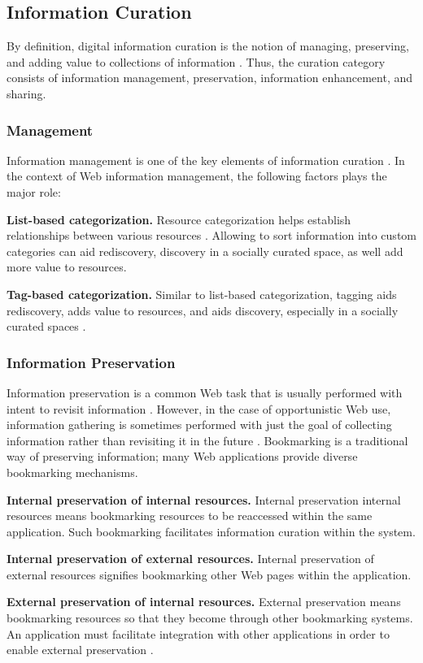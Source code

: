 \documentclass{casconpaper}
\begin{document}
{\subsection{Information Curation}
By definition, digital information curation is the notion of managing, preserving, and adding value to collections of information \cite{beagrie, wittaker}. Thus, the curation category consists of information management, preservation, information enhancement, and sharing.  
} %

{\subsubsection{Management}
Information management is one of the key elements of information curation \cite{beagrie, wittaker}. In the context of Web information management, the following factors plays the major role:

\textbf{List-based categorization.} Resource categorization helps establish relationships between various resources \cite{beagrie, wittaker}. Allowing to sort information into custom categories can aid rediscovery, discovery in a socially curated space, as well add more value to resources.

\textbf{Tag-based categorization.} Similar to list-based categorization, tagging aids rediscovery, adds value to resources, and aids discovery, especially in a socially curated spaces \cite{gruber}.

} %

{\subsubsection{Information Preservation}
Information preservation is a common Web task that is usually performed with intent to revisit information \cite{abrams, wittaker}. However, in the case of opportunistic Web use, information gathering is sometimes performed with just the goal of collecting information rather than revisiting it in the future \cite{lindley}. Bookmarking is a traditional way of preserving information; many Web applications provide diverse bookmarking mechanisms. 

\textbf{Internal preservation of internal resources.} Internal preservation internal resources means bookmarking resources to be reaccessed within the same application. Such bookmarking facilitates information curation within the system.

\textbf{Internal preservation of external resources.} Internal preservation of external resources signifies bookmarking other Web pages within the application. 
  
\textbf{External preservation of internal resources.} External preservation means bookmarking resources so that they become through other bookmarking systems. An application must facilitate integration with other applications in order to enable external preservation \cite{abrams}.

} %
\end{document}
